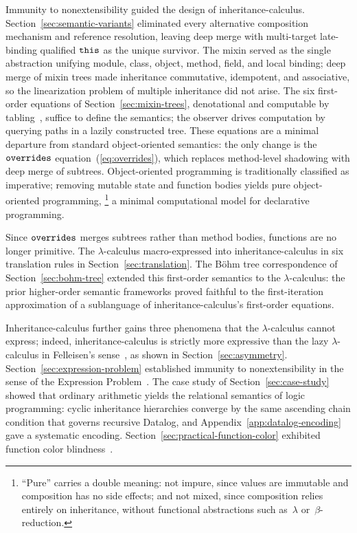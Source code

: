Immunity to nonextensibility guided the design of
inheritance-calculus.
Section~\ref{sec:semantic-variants} eliminated every
alternative composition mechanism and reference resolution,
leaving deep merge with multi-target late-binding qualified
$\mathtt{this}$ as the unique survivor.
The mixin served as the single abstraction unifying module,
class, object, method, field, and local binding;
deep merge of mixin trees made inheritance commutative, idempotent, and associative,
so the linearization problem of multiple inheritance did not arise.
The six first-order equations of Section~\ref{sec:mixin-trees},
denotational and computable by
tabling~\cite{tamaki1986-tabled-resolution}, suffice to
define the semantics; the observer drives computation by
querying paths in a lazily constructed tree.
These equations are a minimal departure from standard
object-oriented semantics: the only change is the $\mathtt{overrides}$ equation~(\ref{eq:overrides}),
which replaces method-level shadowing with deep merge of subtrees.
Object-oriented programming is traditionally classified as
imperative; removing mutable state and function bodies yields
pure object-oriented programming,%
\footnote{
  ``Pure'' carries a double meaning:
  not impure, since values are immutable and composition has no
  side effects; and not mixed, since composition relies entirely on
  inheritance, without functional abstractions such
  as~$\lambda$ or~$\beta$-reduction.
}
a minimal computational model for declarative programming.

Since $\mathtt{overrides}$ merges subtrees rather than method bodies,
functions are no longer primitive.
The $\lambda$-calculus macro-expressed into
inheritance-calculus in six translation rules in
Section~\ref{sec:translation}.
The B\"ohm tree correspondence of
Section~\ref{sec:bohm-tree} extended this first-order
semantics to the $\lambda$-calculus:
the prior higher-order semantic frameworks proved faithful
to the first-iteration approximation of a sublanguage of
inheritance-calculus's first-order equations.

Inheritance-calculus further gains three phenomena
that the $\lambda$-calculus cannot express;
indeed, inheritance-calculus is strictly more expressive
than the lazy $\lambda$-calculus in Felleisen's
sense~\cite{felleisen1991-expressive-power},
as shown in Section~\ref{sec:asymmetry}.
Section~\ref{sec:expression-problem} established immunity
to nonextensibility in the sense of the
Expression Problem~\cite{wadler1998-expression-problem}.
The case study of Section~\ref{sec:case-study} showed that
ordinary arithmetic yields the relational semantics of logic
programming: cyclic inheritance hierarchies converge by
the same ascending chain condition that governs recursive
Datalog, and Appendix~\ref{app:datalog-encoding} gave a
systematic encoding.
Section~\ref{sec:practical-function-color} exhibited
function color
blindness~\cite{nystrom2015-function-color}.


